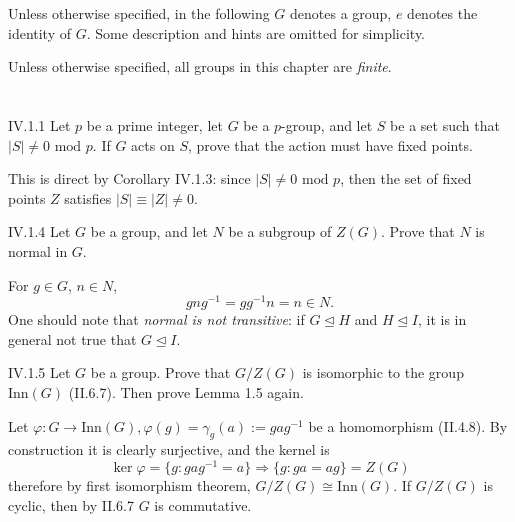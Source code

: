 Unless otherwise specified, in the following $G$ denotes a group, $e$ denotes the identity of $G$. Some description and hints are omitted for simplicity.

Unless otherwise specified, all groups in this chapter are \emph{finite}.

\section{}


\begin{problem}{IV.1.1}
Let $p$ be a prime integer, let $G$ be a $p$-group, and let $S$ be a set such that $|S| \neq 0 \text{ mod } p$. If $G$ acts on $S$, prove that the action must have fixed points.
\end{problem}
\begin{pf}
This is direct by Corollary IV.1.3: since $|S| \neq 0 \text{ mod }p $, then the set of fixed points $Z$ satisfies $|S| \equiv |Z| \neq 0$.	
\end{pf}

\begin{problem}{IV.1.4}
Let $G$ be a group, and let $N$ be a subgroup of $Z(G)$. Prove that $N$ is normal in $G$. 	
\end{problem}
\begin{pf}
For $g \in G$, $n \in N$,
\[
gng^{-1} = gg^{-1}n = n \in N.
\]
One should note that \emph{normal is not transitive}: if $G \unlhd H$ and $H \unlhd I$, it is in general not true that $G \unlhd I$.
\end{pf}

\begin{problem}{IV.1.5}
Let $G$ be a group. Prove that $G/Z(G)$ is isomorphic to the group $\text{Inn}(G)$ (II.6.7). Then prove Lemma 1.5 again.
\end{problem}
\begin{pf}
Let $\varphi : G \to \text{Inn}(G), \varphi(g) = \gamma_g(a) := gag^{-1}$ be a homomorphism (II.4.8). By construction it is clearly surjective, and the kernel is
\[
\ker \varphi = \{g: gag^{-1} = a\} \Rightarrow \{g : ga = ag \}	= Z(G)
\]
therefore by first isomorphism theorem, $G/Z(G) \cong \text{Inn}(G)$. If $G/Z(G)$ is cyclic, then by II.6.7 $G$ is commutative.
\end{pf}

